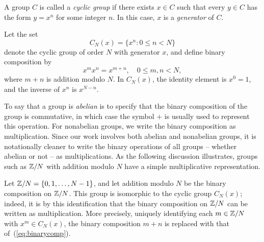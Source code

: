 A group $C$ is called a \emph{cyclic group} if there exists
$x\in C$ such that every $y\in C$ has the form $y=x^n$ for
some integer $n$.  In this case, $x$ is a
\emph{generator} of $C$. 

Let the set
\begin{equation}\label{eq:cyclicGroup}
C_N(x) = \{ x^n : 0 \leq n < N\}
\end{equation} 
denote the cyclic group of order $N$ with
generator $x$, and define binary composition by
\begin{equation}\label{eq:binarycomp}
x^m x^n = x^{m+n}, \quad 0\leq m, n < N,
\end{equation}
where $m+n$ is addition modulo $N$.  
In $C_N(x)$, the identity element %
is $x^0 = 1$, and the inverse of $x^n$ is $x^{N-n}$.

To say that a group is \emph{abelian} is to specify that the binary
composition of the group is commutative, in which case the
symbol $+$ is usually used to represent this operation.
For nonabelian groups, we write the binary
composition as multiplication.  Since our work involves
both abelian and nonabelian groups, it is notationally
cleaner to write the binary operations of all groups --
whether abelian or not -- as multiplications. As the
following discussion illustrates, groups such as $\mathbb{Z}/N$ with
addition modulo $N$ have a simple multiplicative
representation.

\begin{example}\label{ex:ZN}
Let $\mathbb{Z}/N = \{0, 1, \ldots, N-1\}$,
and let addition modulo $N$ be the binary composition on $\mathbb{Z}/N$.
This group is isomorphic to the cyclic group $C_N(x)$; %
indeed, it is by this identification %
that the binary composition on $\mathbb{Z}/N$ can be written as multiplication. 
More precisely, uniquely identifying each $m \in \mathbb{Z}/N$
with $x^m \in C_N(x)$, the binary composition
$m+n$ is replaced with that of~(\ref{eq:binarycomp}).  
\end{example}

